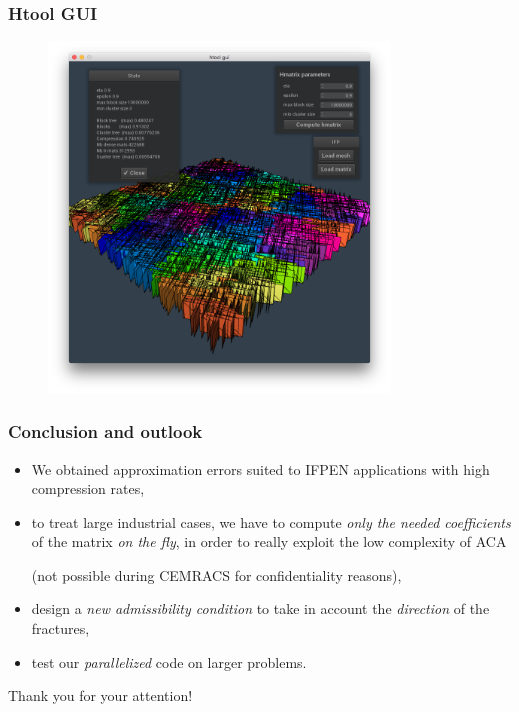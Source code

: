 \begin{frame}
\frametitle{Htool GUI}

\begin{figure}
\vspace{-0.5cm}
\hspace{-0.8cm}
\includegraphics[height = 9.3cm]{../images/gui.png}
\vspace{-0.5cm}
\end{figure}

\end{frame}




\begin{frame}
\frametitle{Conclusion and outlook}

\begin{itemize}
\item
We obtained approximation errors suited to IFPEN applications with high compression rates,
\item
to treat large industrial cases, we have to compute \emph{only the needed coefficients} of the matrix \emph{on the fly}, in order to really exploit the low complexity of ACA 

(not possible during CEMRACS for confidentiality reasons),
\item
design a \emph{new admissibility condition} to take in account the \emph{direction} of the fractures,
\item
test our \emph{parallelized} code on larger problems.
\end{itemize}

\pause
\bigskip
\begin{center}
Thank you for your attention!
\end{center}

\end{frame}












